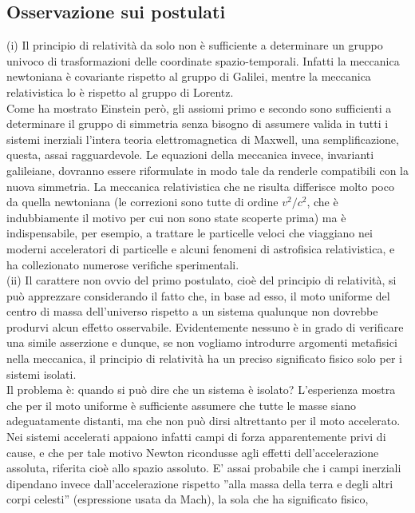 \documentclass[a4paper,11pt]{book}
\theoremstyle{plain}
\theoremstyle{definition}
\begin{document}
\subsection{Osservazione sui postulati}
(i) Il principio di relatività da solo non è sufficiente a determinare un gruppo univoco 
di trasformazioni delle coordinate spazio-temporali. Infatti la meccanica newtoniana è 
covariante rispetto al gruppo di Galilei, mentre la meccanica relativistica lo è rispetto al 
gruppo di Lorentz. \\
Come ha mostrato Einstein però, gli assiomi primo e secondo sono sufficienti a determinare 
il gruppo di simmetria senza bisogno di assumere valida in tutti i sistemi inerziali l'intera 
teoria elettromagnetica di Maxwell, una semplificazione, questa, assai ragguardevole. Le 
equazioni della meccanica invece, invarianti galileiane, dovranno essere riformulate in 
modo tale da renderle compatibili con la nuova simmetria. La meccanica relativistica che 
ne risulta differisce molto poco da quella newtoniana (le correzioni sono tutte di ordine $v^2/c^2$, che è indubbiamente il motivo per cui non sono state scoperte prima) ma è indispensabile, per esempio, 
a trattare le particelle veloci che viaggiano nei moderni acceleratori di particelle e alcuni 
fenomeni di astrofisica relativistica, e ha collezionato numerose verifiche sperimentali. \\
(ii) Il carattere non ovvio del primo postulato, cioè del principio di relatività, si può 
apprezzare considerando il fatto che, in base ad esso, il moto uniforme del centro di 
massa dell'universo rispetto a un sistema qualunque non dovrebbe produrvi alcun effetto
osservabile. Evidentemente nessuno è in grado di verificare una simile asserzione e dunque, 
se non vogliamo introdurre argomenti metafisici nella meccanica, il principio di relatività 
ha un preciso significato fisico solo per i sistemi isolati. \\
Il problema è: quando si può dire che un sistema è isolato? L'esperienza mostra che per il 
moto uniforme è sufficiente assumere che tutte le masse siano adeguatamente distanti, ma 
che non può dirsi altrettanto per il moto accelerato. Nei sistemi accelerati appaiono infatti 
campi di forza apparentemente privi di cause, e che per tale motivo Newton ricondusse 
agli effetti dell'accelerazione assoluta, riferita cioè allo spazio assoluto. E' assai probabile 
che i campi inerziali dipendano invece dall'accelerazione rispetto ''alla massa della terra 
e degli altri corpi celesti'' (espressione usata da Mach), la sola che ha significato fisico, 
\end{document}

